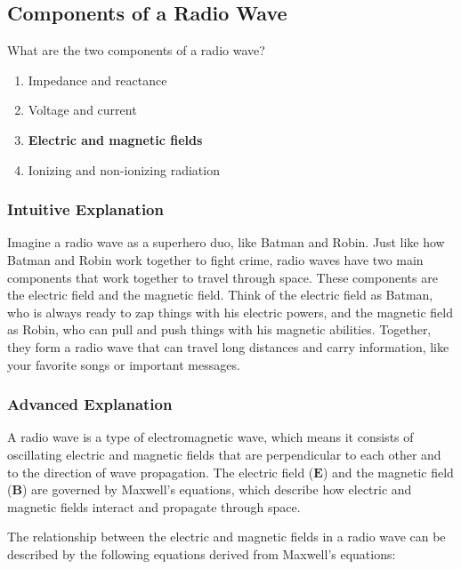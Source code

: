 \subsection{Components of a Radio Wave}
\label{T3B03}

\begin{tcolorbox}[colback=gray!10!white,colframe=black!75!black,title=T3B03]
What are the two components of a radio wave?
\begin{enumerate}[label=\Alph*)]
    \item Impedance and reactance
    \item Voltage and current
    \item \textbf{Electric and magnetic fields}
    \item Ionizing and non-ionizing radiation
\end{enumerate}
\end{tcolorbox}

\subsubsection{Intuitive Explanation}
Imagine a radio wave as a superhero duo, like Batman and Robin. Just like how Batman and Robin work together to fight crime, radio waves have two main components that work together to travel through space. These components are the electric field and the magnetic field. Think of the electric field as Batman, who is always ready to zap things with his electric powers, and the magnetic field as Robin, who can pull and push things with his magnetic abilities. Together, they form a radio wave that can travel long distances and carry information, like your favorite songs or important messages.

\subsubsection{Advanced Explanation}
A radio wave is a type of electromagnetic wave, which means it consists of oscillating electric and magnetic fields that are perpendicular to each other and to the direction of wave propagation. The electric field (\(\mathbf{E}\)) and the magnetic field (\(\mathbf{B}\)) are governed by Maxwell's equations, which describe how electric and magnetic fields interact and propagate through space.

The relationship between the electric and magnetic fields in a radio wave can be described by the following equations derived from Maxwell's equations:

